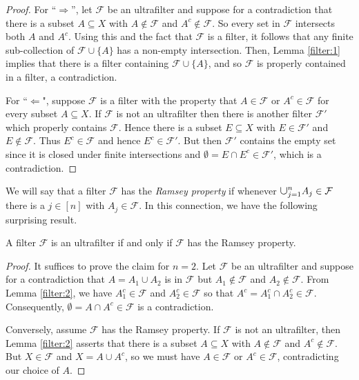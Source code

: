 \begin{proof}
For ``$\Rightarrow$'', let \( \mathcal{F} \) be an ultrafilter and suppose for a contradiction that there is a subset \( A \subseteq X \) with \( A \notin \mathcal{F} \) and \( A^{c} \notin \mathcal{F} \). So every set in \( \mathcal{F} \) intersects both \( A \) and \( A^{c} \). Using this and the fact that \( \mathcal{F} \) is a filter, it follows that any finite sub-collection of \( \mathcal{F} \cup \{ A \} \) has a non-empty intersection. Then, Lemma \ref{filter:1} implies that there is a filter containing \( \mathcal{F} \cup \{ A \} \), and so \( \mathcal{F} \) is properly contained in a filter, a contradiction.

For ``\(\Leftarrow\)", suppose \( \mathcal{F} \) is a filter with the property that \( A \in \mathcal{F} \) or \( A^{c} \in \mathcal{F} \) for every subset \( A \subseteq X \). If \( \mathcal{F} \) is not an ultrafilter then there is another filter \( \mathcal{F} ' \) which properly contains \( \mathcal{F} \). Hence there is a subset \( E \subseteq X \) with \( E \in \mathcal{F} ' \) and \( E \notin \mathcal{F} \). Thus \( E^{c} \in \mathcal{F} \) and hence \( E^{c} \in \mathcal{F} ' \). But then \( \mathcal{F} ' \) contains the empty set since it is closed under finite intersections and \( \emptyset = E \cap E^{c} \in \mathcal{F} ' \), which is a contradiction.
\end{proof}
We will say that a filter \( \mathcal{F} \) has the \emph{Ramsey property} if whenever \( \medcup_{j=1}^{n} A_{j} \in \mathcal{F} \) there is a \( j \in [n] \) with \( A_{j} \in \mathcal{F} \). In this connection, we have the following surprising result.
\begin{lemma}
\label{filter:3}
A filter \( \mathcal{F} \) is an ultrafilter if and only if \( \mathcal{F} \) has the Ramsey property.
\end{lemma}
\begin{proof}
It suffices to prove the claim for \( n = 2 \). Let \( \mathcal{F} \) be an ultrafilter and suppose for a contradiction that \( A = A_1 \cup A_2 \) is in \( \mathcal{F}\) but \( A_1 \notin \mathcal{F} \) and \( A_2 \notin \mathcal{F} \). From Lemma \ref{filter:2}, we have \( A_1^{c} \in \mathcal{F} \) and \( A_2^{c} \in \mathcal{F} \) so that \( A^{c} = A_1^{c} \cap A_2^{c} \in \mathcal{F} \). Consequently, \( \emptyset = A \cap A^{c} \in \mathcal{F} \) is a contradiction. 

Conversely, assume \( \mathcal{F} \) has the Ramsey property. If \( \mathcal{F} \) is not an ultrafilter, then Lemma \ref{filter:2} asserts that there is a subset \( A \subseteq X \) with \( A \notin \mathcal{F} \) and \( A^{c} \notin \mathcal{F} \). But \(X \in \mathcal{F} \) and \( X = A \cup A^{c} \), so we must have \( A \in \mathcal{F} \) or \( A^{c} \in \mathcal{F} \), contradicting our choice of \( A \).
\end{proof}

